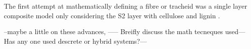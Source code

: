  The first attempt at mathematically defining a fibre or tracheid was a single layer composite model only considering the S2 layer with cellulose and lignin \cite{Barber_1964}.  
 
 
 --maybe a little on these advances, ----- Breifly discuss the math
tecneques used---Has any one used descrete or hybrid systems?---
